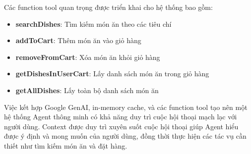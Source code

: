 Các function tool quan trọng được triển khai cho hệ thống bao gồm:

\begin{itemize}
    \item \textbf{searchDishes}: Tìm kiếm món ăn theo các tiêu chí
    \item \textbf{addToCart}: Thêm món ăn vào giỏ hàng
    \item \textbf{removeFromCart}: Xóa món ăn khỏi giỏ hàng
    \item \textbf{getDishesInUserCart}: Lấy danh sách món ăn trong giỏ hàng
    \item \textbf{getAllDishes}: Lấy toàn bộ danh sách món ăn
\end{itemize}

Việc kết hợp Google GenAI, in-memory cache, và các function tool tạo nên một hệ thống Agent thông minh có khả năng duy trì cuộc hội thoại mạch lạc với người dùng. Context được duy trì xuyên suốt cuộc hội thoại giúp Agent hiểu được ý định và mong muốn của người dùng, đồng thời thực hiện các tác vụ cần thiết như tìm kiếm món ăn và đặt hàng.
